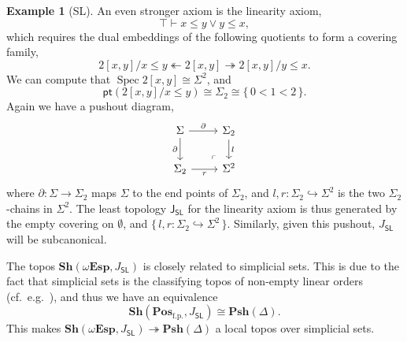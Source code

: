 \documentclass[a4paper,12pt]{amsart}
\theoremstyle{definition}
\newtheorem{example}[theorem]{Example}
\newcommand{\mb}[1]{\mathbf{#1}}
\newcommand{\mr}[1]{\mathrm{#1}}
\newcommand{\ms}[1]{\mathsf{#1}}
\newcommand{\Pos}{\mb{Pos}}
\newcommand{\sh}{\mb{Sh}}
\newcommand{\psh}{\mb{Psh}}
\newcommand{\set}[1]{\{\,#1\,\}}
\newcommand{\surj}{\twoheadrightarrow}
\newcommand{\hook}{\hookrightarrow}
\newcommand{\fp}{_{\mr{f.p.}}}
\newcommand{\emp}{\emptyset}
\newcommand{\pt}{\ms{pt}}
\newcommand{\wTop}{\omega\mb{Esp}}
\newcommand{\spec}{\operatorname{Spec}}
\begin{document}
\begin{example}[SL]
  An even stronger axiom is the linearity axiom, 
  \[ \top \vdash x \le y \vee y \le x, \]
  which requires the dual embeddings of the following quotients to form a covering family,
  \[ 2[x,y]/x \le y \twoheadleftarrow 2[x,y] \surj 2[x,y]/y \le x. \]
  We can compute that $\spec 2[x,y] \cong \Sigma^2$, and 
  \[ \pt(2[x,y]/x \le y) \cong \Sigma_2 \cong \set{0 < 1 < 2}. \]
  Again we have a pushout diagram,
  \[
  \begin{tikzcd}
    \Sigma \ar[r, "\partial"] \ar[d, "\partial"'] & \Sigma_2 \ar[d, "l"] \\ 
    \Sigma_2 \ar[r, "r"'] & \Sigma^2
    \arrow["\lrcorner"{anchor=center, pos=0.125, rotate=180}, draw=none, from=2-2, to=1-1]
  \end{tikzcd}
  \]
  where $\partial : \Sigma \to \Sigma_2$ maps $\Sigma$ to the end points of $\Sigma_2$, and $l,r : \Sigma_2 \hook \Sigma^2$ is the two $\Sigma_2$-chains in $\Sigma^2$. The least topology $\ms J_{\ms{SL}}$ for the linearity axiom is thus generated by the empty covering on $\emp$, and $\set{l,r : \Sigma_2 \hook \Sigma^2}$. Similarly, given this pushout, $J_{\ms{SL}}$ will be subcanonical.

  The topos $\sh(\wTop,J_{\ms{SL}})$ is closely related to simplicial sets. This is due to the fact that simplicial sets is the classifying topos of non-empty linear orders (cf.\ e.g.~\cite[VIII. 8]{maclane1992sheaves}), and thus we have an equivalence 
  \[ \sh(\Pos\fp,J_{\ms{SL}}) \cong \psh(\Delta). \]
  This makes $\sh(\wTop,J_{\ms{SL}}) \surj \psh(\Delta)$ a local topos over simplicial sets.
\end{example}
\end{document}

